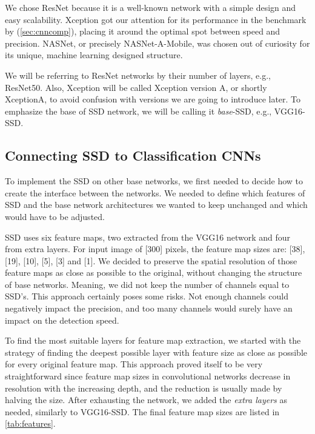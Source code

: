 We chose ResNet because it is a well-known network with a simple design and easy scalability. Xception got our attention for its performance in the benchmark by \citeauthor{bib:cnnbenchmark} (\cref{sec:cnncomp}), placing it around the optimal spot between speed and precision. NASNet, or precisely NASNet-A-Mobile, was chosen out of curiosity for its unique, machine learning designed structure.

We will be referring to ResNet networks by their number of layers, e.g., ResNet50. Also, Xception will be called Xception version A, or shortly XceptionA, to avoid confusion with versions we are going to introduce later. To emphasize the base of SSD network, we will be calling it \textit{base}-SSD, e.g., VGG16-SSD.

\subsection{Connecting SSD to Classification CNNs}
To implement the SSD on other base networks, we first needed to decide how to create the interface between the networks. We needed to define which features of SSD and the base network architectures we wanted to keep unchanged and which would have to be adjusted.

SSD uses six feature maps, two extracted from the VGG16 network and four from extra layers. For input image of [300] pixels, the feature map sizes are: [38], [19], [10], [5], [3] and [1]. We decided to preserve the spatial resolution of those feature maps as close as possible to the original, without changing the structure of base networks. Meaning, we did not keep the number of channels equal to SSD's. This approach certainly poses some risks. Not enough channels could negatively impact the precision, and too many channels would surely have an impact on the detection speed.

To find the most suitable layers for feature map extraction, we started with the strategy of finding the deepest possible layer with feature size as close as possible for every original feature map. This approach proved itself to be very straightforward since feature map sizes in convolutional networks decrease in resolution with the increasing depth, and the reduction is usually made by halving the size. After exhausting the network, we added the \textit{extra layers} as needed, similarly to VGG16-SSD. The final feature map sizes are listed in \cref{tab:features}. 

